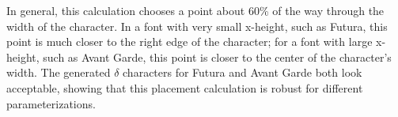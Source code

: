 In general, this calculation chooses a point about 60\% of the way through the
width of the character. In a font with very small x-height, such as Futura, this
point is much closer to the right edge of the character; for a font with large
x-height, such as Avant Garde, this point is closer to the center of the
character's width. The generated $\delta$ characters for Futura and Avant Garde
both look acceptable, showing that this placement calculation is robust for
different parameterizations.
